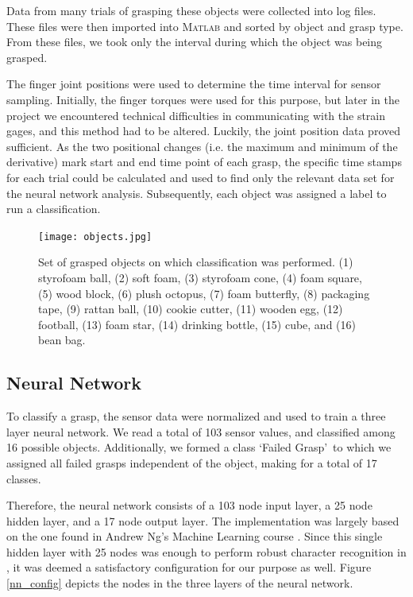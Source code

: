 Data from many trials of grasping these objects were collected into log files. These files were then imported into \textsc{Matlab} and sorted by object and grasp type. From these files, we took only the interval during which the object was being grasped.

The finger joint positions were used to determine the time interval for sensor sampling. Initially, the finger torques were used for this purpose, but later in the project we encountered technical difficulties in communicating with the strain gages, and this method had to be altered. Luckily, the joint position data proved sufficient. As the two positional changes (i.e. the maximum and minimum of the derivative) mark start and end time point of each grasp, the specific time stamps for each trial could be calculated and used to find only the relevant data set for the neural network analysis. Subsequently, each object was assigned a label to run a classification.
\begin{figure}[t]
\begin{center}
	\hspace{-0.5cm}
	\texttt{[image: objects.jpg]}
	\caption{Set of grasped objects on which classification was performed. (1) styrofoam ball, (2) soft foam, (3) styrofoam cone, (4) foam square, (5) wood block, (6) plush octopus, (7) foam butterfly, (8) packaging tape, (9) rattan ball, (10) cookie cutter, (11) wooden egg, (12) football, (13) foam star, (14) drinking bottle, (15) cube, and (16) bean bag.}
	\label{objects}
\end{center}
\end{figure}

\subsection*{Neural Network}
To classify a grasp, the sensor data were normalized and used to train a three layer neural network. We read a total of 103 sensor values, and classified among 16 possible objects. Additionally, we formed a class \lq Failed Grasp\rq\ to which we assigned all failed grasps independent of the object, making for a total of 17 classes.

Therefore, the neural network consists of a 103 node input layer, a 25 node hidden layer, and a 17 node output layer. The implementation was largely based on the one found in Andrew Ng's Machine Learning course \cite{ML9}. Since this single hidden layer with 25 nodes was enough to perform robust character recognition in \cite{ML9}, it was deemed a satisfactory configuration for our purpose as well. Figure \ref{nn_config} depicts the nodes in the three layers of the neural network.

